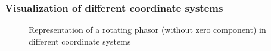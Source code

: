 \begin{frame}
	\frametitle{Visualization of different coordinate systems}
    \begin{figure}
        \centering
        \vspace{-0.25cm}
        \caption{Representation of a rotating phasor (without zero component) in different coordinate systems}
        \label{fig:Clarke_Park_animation}
    \end{figure}
\end{frame}

